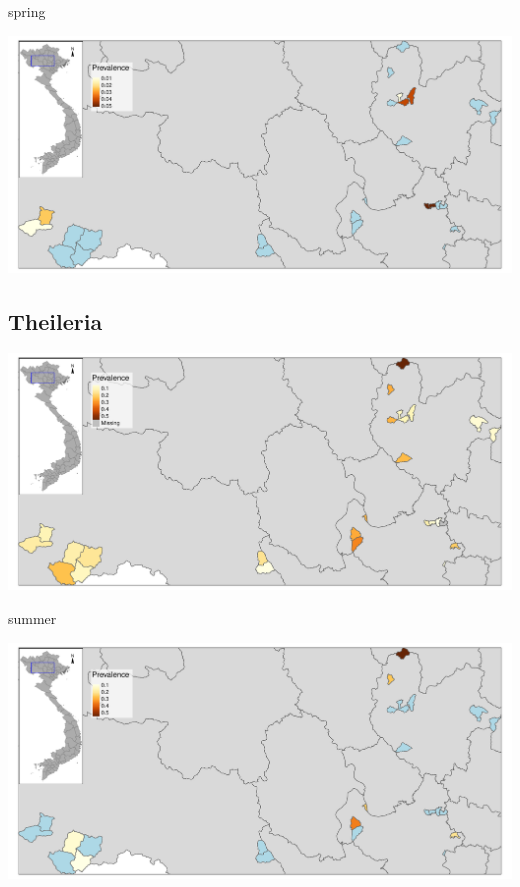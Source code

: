 \begin{frame}
spring\\
\begin{center}
\includegraphics[width=1\textwidth]{map04_spring.pdf}
\end{center}
\end{frame}


\subsection{Theileria}
\begin{frame}
\begin{center}
\includegraphics[width=1\textwidth]{map05.pdf}
\end{center}
\end{frame}

\begin{frame}
summer\\
\begin{center}
\includegraphics[width=1\textwidth]{map05_summer.pdf}
\end{center}
\end{frame}


